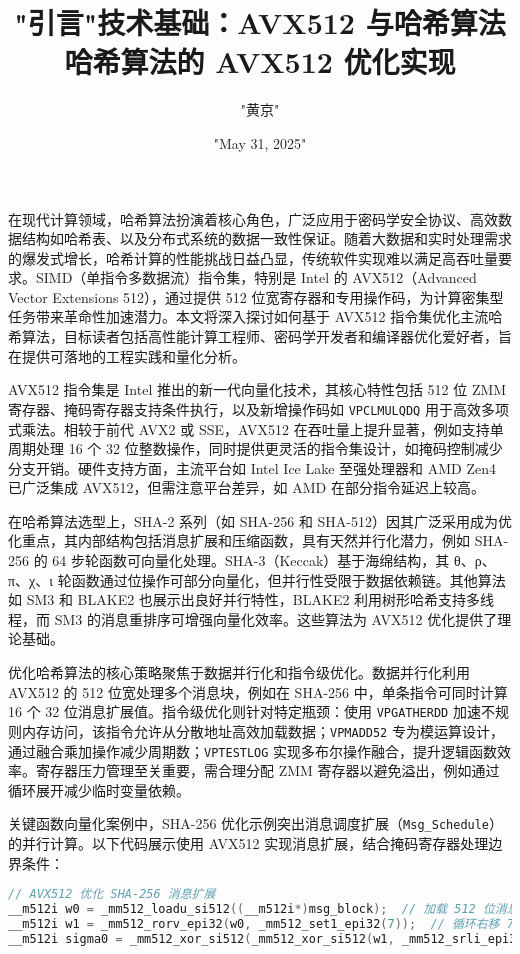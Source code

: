 \title{"引言"}
\author{"黄京"}
\date{"May 31, 2025"}
\maketitle
在现代计算领域，哈希算法扮演着核心角色，广泛应用于密码学安全协议、高效数据结构如哈希表、以及分布式系统的数据一致性保证。随着大数据和实时处理需求的爆发式增长，哈希计算的性能挑战日益凸显，传统软件实现难以满足高吞吐量要求。SIMD（单指令多数据流）指令集，特别是 Intel 的 AVX512（Advanced Vector Extensions 512），通过提供 512 位宽寄存器和专用操作码，为计算密集型任务带来革命性加速潜力。本文将深入探讨如何基于 AVX512 指令集优化主流哈希算法，目标读者包括高性能计算工程师、密码学开发者和编译器优化爱好者，旨在提供可落地的工程实践和量化分析。\par
\title{技术基础：AVX512 与哈希算法}
AVX512 指令集是 Intel 推出的新一代向量化技术，其核心特性包括 512 位 ZMM 寄存器、掩码寄存器支持条件执行，以及新增操作码如 \verb!VPCLMULQDQ! 用于高效多项式乘法。相较于前代 AVX2 或 SSE，AVX512 在吞吐量上提升显著，例如支持单周期处理 16 个 32 位整数操作，同时提供更灵活的指令集设计，如掩码控制减少分支开销。硬件支持方面，主流平台如 Intel Ice Lake 至强处理器和 AMD Zen4 已广泛集成 AVX512，但需注意平台差异，如 AMD 在部分指令延迟上较高。\par
在哈希算法选型上，SHA-2 系列（如 SHA-256 和 SHA-512）因其广泛采用成为优化重点，其内部结构包括消息扩展和压缩函数，具有天然并行化潜力，例如 SHA-256 的 64 步轮函数可向量化处理。SHA-3（Keccak）基于海绵结构，其 θ、ρ、π、χ、ι 轮函数通过位操作可部分向量化，但并行性受限于数据依赖链。其他算法如 SM3 和 BLAKE2 也展示出良好并行特性，BLAKE2 利用树形哈希支持多线程，而 SM3 的消息重排序可增强向量化效率。这些算法为 AVX512 优化提供了理论基础。\par
\title{哈希算法的 AVX512 优化实现}
优化哈希算法的核心策略聚焦于数据并行化和指令级优化。数据并行化利用 AVX512 的 512 位宽处理多个消息块，例如在 SHA-256 中，单条指令可同时计算 16 个 32 位消息扩展值。指令级优化则针对特定瓶颈：使用 \verb!VPGATHERDD! 加速不规则内存访问，该指令允许从分散地址高效加载数据；\verb!VPMADD52! 专为模运算设计，通过融合乘加操作减少周期数；\verb!VPTESTLOG! 实现多布尔操作融合，提升逻辑函数效率。寄存器压力管理至关重要，需合理分配 ZMM 寄存器以避免溢出，例如通过循环展开减少临时变量依赖。\par
关键函数向量化案例中，SHA-256 优化示例突出消息调度扩展（\verb!Msg_Schedule!）的并行计算。以下代码展示使用 AVX512 实现消息扩展，结合掩码寄存器处理边界条件：\par
\begin{lstlisting}[language=c]
// AVX512 优化 SHA-256 消息扩展
__m512i w0 = _mm512_loadu_si512((__m512i*)msg_block);  // 加载 512 位消息块
__m512i w1 = _mm512_rorv_epi32(w0, _mm512_set1_epi32(7));  // 循环右移 7 位
__m512i sigma0 = _mm512_xor_si512(_mm512_xor_si512(w1, _mm512_srli_epi32(w0, 3)), _mm512_slli_epi32(w0, 14));  // σ 0 函数计算
\end{lstlisting}
